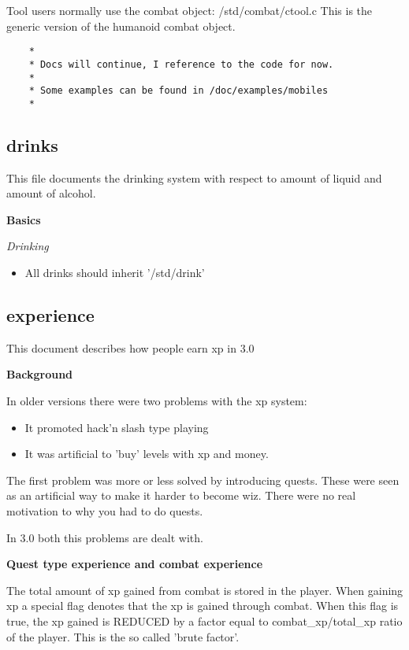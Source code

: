 Tool users normally use the combat object: /std/combat/ctool.c
This is the generic version of the humanoid combat object. 

\begin{verbatim}
    *
    * Docs will continue, I reference to the code for now.
    *
    * Some examples can be found in /doc/examples/mobiles
    *
\end{verbatim}

\subsection{drinks}

This file documents the drinking system with respect to amount of liquid
and amount of alcohol.

{\bf Basics}

{\em Drinking}

\begin{itemize}
\item All drinks should inherit '/std/drink'
\end{itemize}

\subsection{experience}

This document describes how people earn xp in 3.0

{\bf Background}

In older versions there were two problems with the xp system:

\begin{itemize}
    \item  It promoted hack'n slash type playing
    \item  It was artificial to 'buy' levels with xp and money.
\end{itemize}

The first problem was more or less solved by introducing quests. These were
seen as an artificial way to make it harder to become wiz. There were no
real motivation to why you had to do quests.

In 3.0 both this problems are dealt with.

{\bf Quest type experience and combat experience}


The total amount of xp gained from combat is stored in the player. When gaining
xp a special flag denotes that the xp is gained through combat. When this flag
is true, the xp gained is REDUCED by a factor equal to combat\_xp/total\_xp
ratio of the player. This is the so called 'brute factor'.

